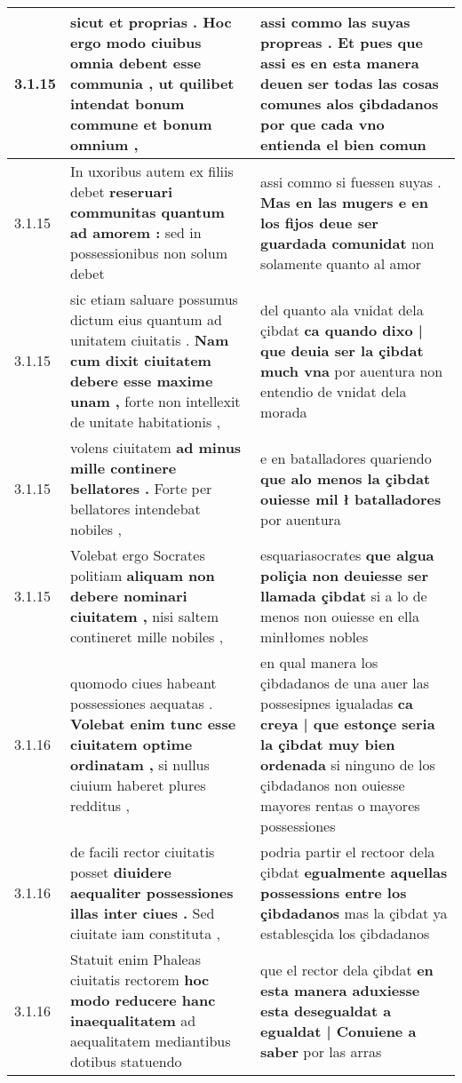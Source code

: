 \begin{tabular}{|p{1cm}|p{6.5cm}|p{6.5cm}|}
3.1.15 & sicut et proprias . \textbf{ Hoc ergo modo ciuibus omnia debent esse communia , } ut quilibet intendat bonum commune et bonum omnium , & assi commo las suyas propreas . \textbf{ Et pues que assi es en esta manera deuen ser todas las cosas comunes alos çibdadanos } por que cada vno entienda el bien comun \\\hline
3.1.15 & In uxoribus autem ex filiis debet \textbf{ reseruari communitas quantum ad amorem : } sed in possessionibus non solum debet & assi commo si fuessen suyas . \textbf{ Mas en las mugers e en los fijos deue ser guardada comunidat } non solamente quanto al amor \\\hline
3.1.15 & sic etiam saluare possumus dictum eius quantum ad unitatem ciuitatis . \textbf{ Nam cum dixit ciuitatem debere esse maxime unam , } forte non intellexit de unitate habitationis , & del quanto ala vnidat dela çibdat \textbf{ ca quando dixo | que deuia ser la çibdat much vna } por auentura non entendio de vnidat dela morada \\\hline
3.1.15 & volens ciuitatem \textbf{ ad minus mille continere bellatores . } Forte per bellatores intendebat nobiles , & e en batalladores quariendo \textbf{ que alo menos la çibdat ouiesse mil ł batalladores } por auentura \\\hline
3.1.15 & Volebat ergo Socrates politiam \textbf{ aliquam non debere nominari ciuitatem , } nisi saltem contineret mille nobiles , & esquariasocrates \textbf{ que algua poliçia non deuiesse ser llamada çibdat } si a lo de menos non ouiesse en ella minłłomes nobles \\\hline
3.1.16 & quomodo ciues habeant possessiones aequatas . \textbf{ Volebat enim tunc esse ciuitatem optime ordinatam , } si nullus ciuium haberet plures redditus , & en qual manera los çibdadanos de una auer las possesipnes igualadas \textbf{ ca creya | que estonçe seria la çibdat muy bien ordenada } si ninguno de los çibdadanos non ouiesse mayores rentas o mayores possessiones \\\hline
3.1.16 & de facili rector ciuitatis posset \textbf{ diuidere aequaliter possessiones illas inter ciues . } Sed ciuitate iam constituta , & podria partir el rectoor dela çibdat \textbf{ egualmente aquellas possessions entre los çibdadanos } mas la çibdat ya establesçida los çibdadanos \\\hline
3.1.16 & Statuit enim Phaleas ciuitatis rectorem \textbf{ hoc modo reducere hanc inaequalitatem } ad aequalitatem mediantibus dotibus statuendo & que el rector dela çibdat \textbf{ en esta manera aduxiesse esta desegualdat a egualdat | Conuiene a saber } por las arras \\\hline

\end{tabular}
